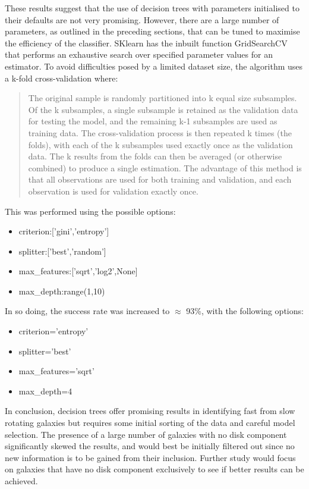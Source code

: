 These results suggest that the use of decision trees with parameters initialised to their defaults are not very promising. However, there are a large number of parameters, as outlined in the preceding sections, that can be tuned to maximise the efficiency of the classifier. SKlearn has the inbuilt function GridSearchCV that performs an exhaustive search over specified parameter values for an estimator. To avoid difficulties posed by a limited dataset size, the algorithm uses a k-fold cross-validation where:
\begin{quotation}
	The original sample is randomly partitioned into k equal size subsamples. Of the k subsamples, a single subsample is retained as the validation data for testing the model, and the remaining k-1 subsamples are used as training data. The cross-validation process is then repeated k times (the folds), with each of the k subsamples used exactly once as the validation data. The k results from the folds can then be averaged (or otherwise combined) to produce a single estimation. The advantage of this method is that all observations are used for both training and validation, and each observation is used for validation exactly once.\cite{vanschoren}
\end{quotation}
This was performed using the possible options:
\begin{itemize}
	\item criterion:['gini','entropy']
	\item splitter:['best','random']
	\item max\_features:['sqrt','log2',None]
	\item max\_depth:range(1,10)
\end{itemize}
In so doing, the success rate was increased to $\approx$ 93\%, with the following options:
\begin{itemize}
	\item criterion='entropy'
	\item splitter='best'
	\item max\_features='sqrt'
	\item max\_depth=4
\end{itemize}
In conclusion, decision trees offer promising results in identifying fast from slow rotating galaxies but requires some initial sorting of the data and careful model selection. The presence of a large number of galaxies with no disk component significantly skewed the results, and would best be initially filtered out since no new information is to be gained from their inclusion. Further study would focus on galaxies that have no disk component exclusively to see if better results can be achieved.